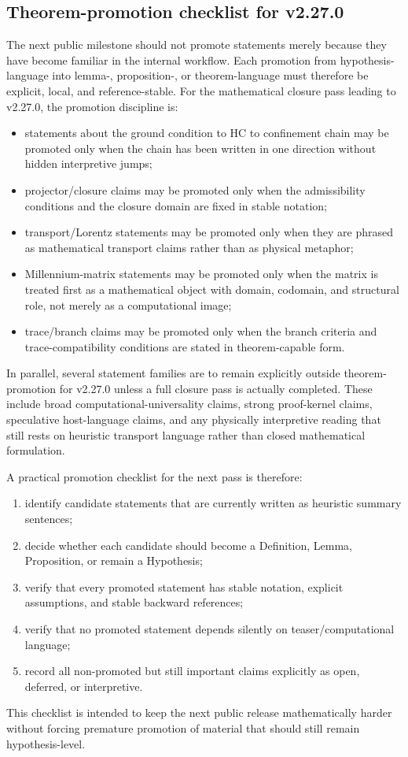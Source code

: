 \subsection*{Theorem-promotion checklist for v2.27.0}
The next public milestone should not promote statements merely because they have become familiar in the internal workflow. Each promotion from hypothesis-language into lemma-, proposition-, or theorem-language must therefore be explicit, local, and reference-stable. For the mathematical closure pass leading to v2.27.0, the promotion discipline is:
\begin{itemize}[leftmargin=*]
  \item statements about the ground condition to HC to confinement chain may be promoted only when the chain has been written in one direction without hidden interpretive jumps;
  \item projector/closure claims may be promoted only when the admissibility conditions and the closure domain are fixed in stable notation;
  \item transport/Lorentz statements may be promoted only when they are phrased as mathematical transport claims rather than as physical metaphor;
  \item Millennium-matrix statements may be promoted only when the matrix is treated first as a mathematical object with domain, codomain, and structural role, not merely as a computational image;
  \item trace/branch claims may be promoted only when the branch criteria and trace-compatibility conditions are stated in theorem-capable form.
\end{itemize}
In parallel, several statement families are to remain explicitly outside theorem-promotion for v2.27.0 unless a full closure pass is actually completed. These include broad computational-universality claims, strong proof-kernel claims, speculative host-language claims, and any physically interpretive reading that still rests on heuristic transport language rather than closed mathematical formulation.

A practical promotion checklist for the next pass is therefore:
\begin{enumerate}[leftmargin=*]
  \item identify candidate statements that are currently written as heuristic summary sentences;
  \item decide whether each candidate should become a Definition, Lemma, Proposition, or remain a Hypothesis;
  \item verify that every promoted statement has stable notation, explicit assumptions, and stable backward references;
  \item verify that no promoted statement depends silently on teaser/computational language;
  \item record all non-promoted but still important claims explicitly as open, deferred, or interpretive.
\end{enumerate}
This checklist is intended to keep the next public release mathematically harder without forcing premature promotion of material that should still remain hypothesis-level.

